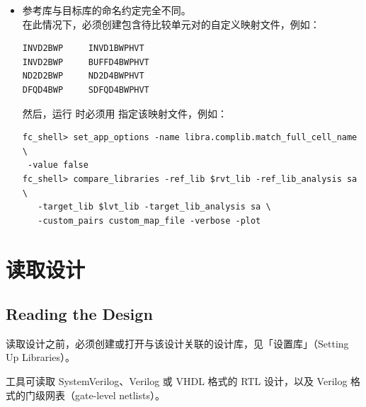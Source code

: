 \begin{enumerate}
\begin{itemize}
        在此情况下，必须创建包含下列信息的词法属性映射文件：
\begin{lstlisting}
lexical_cell_prefix_name      ND2  nand2
lexical_drive1_name               D1   x1
lexical_device_threshold_voltage  SVT  svth
\end{lstlisting}
        然后，运行  时必须用  指定该词法属性映射文件，例如：
\begin{lstlisting}
fc_shell> set_app_options -name libra.complib.match_full_cell_name \
 -value false
fc_shell> compare_libraries -ref_lib $rvt_lib -ref_lib_analysis sa \
   -target_lib $lvt_lib -target_lib_analysis sa \
   -lex_attr_mapping attribute_map_file -verbose -plot
\end{lstlisting}

      \item 参考库与目标库的命名约定完全不同。\\
        在此情况下，必须创建包含待比较单元对的自定义映射文件，例如：
\begin{lstlisting}
INVD2BWP     INVD1BWPHVT
INVD2BWP     BUFFD4BWPHVT
ND2D2BWP     ND2D4BWPHVT
DFQD4BWP     SDFQD4BWPHVT
\end{lstlisting}
        然后，运行  时必须用  指定该映射文件，例如：
\begin{lstlisting}
fc_shell> set_app_options -name libra.complib.match_full_cell_name \
 -value false
fc_shell> compare_libraries -ref_lib $rvt_lib -ref_lib_analysis sa \
   -target_lib $lvt_lib -target_lib_analysis sa \
   -custom_pairs custom_map_file -verbose -plot
\end{lstlisting}
    \end{itemize}
\end{enumerate}

\section{读取设计}
\subsection*{Reading the Design}

读取设计之前，必须创建或打开与该设计关联的设计库，见「设置库」（Setting Up Libraries）。

工具可读取 SystemVerilog、Verilog 或 VHDL 格式的 RTL 设计，以及 Verilog 格式的门级网表（gate-level netlists）。

